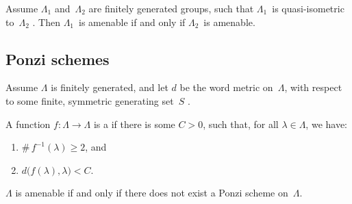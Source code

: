 \begin{prop} \label{AmenQIinvt}
Assume $\Lambda_1$ and~$\Lambda_2$ are finitely generated groups, such that $\Lambda_1$~is quasi-isometric to~$\Lambda_2$ .
Then $\Lambda_1$~is amenable if and only if $\Lambda_2$~is amenable.
\end{prop}


\subsection{Ponzi schemes}

Assume $\Lambda$ is finitely generated, and let $d$ be the word metric on~$\Lambda$, with respect to some finite, symmetric generating set~$S$ .

\begin{defn}
A function $f \colon \Lambda \to \Lambda$ is a  if there is some $C > 0$, such that, for all $\lambda \in \Lambda$, we have:
		\begin{enumerate}
		\item $\# \, f^{-1}(\lambda) \ge 2$,
		and
		\item $d \bigl( f(\lambda), \lambda \bigr) < C$.
		\end{enumerate}
\end{defn}


\begin{thm} \label{AmenNoPonzi}
 $\Lambda$ is amenable if and only if there does not exist a Ponzi scheme on~$\Lambda$.
\end{thm}





